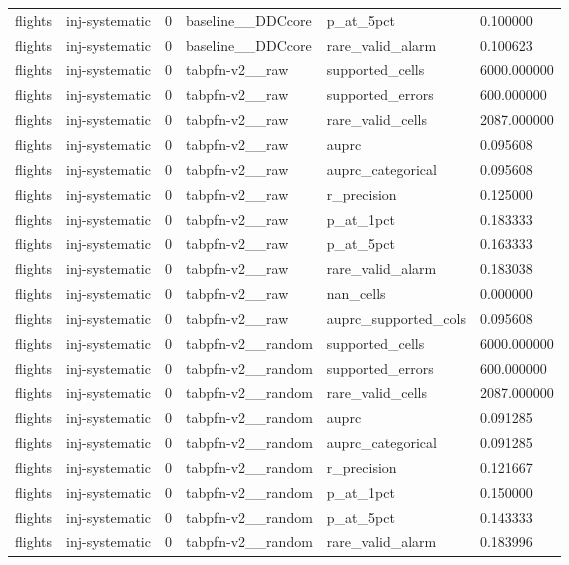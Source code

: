 \begin{tabular}{llllll}
flights & inj-systematic & 0 & baseline\_\_DDCcore & p\_at\_5pct & 0.100000 \\
flights & inj-systematic & 0 & baseline\_\_DDCcore & rare\_valid\_alarm & 0.100623 \\
flights & inj-systematic & 0 & tabpfn-v2\_\_raw & supported\_cells & 6000.000000 \\
flights & inj-systematic & 0 & tabpfn-v2\_\_raw & supported\_errors & 600.000000 \\
flights & inj-systematic & 0 & tabpfn-v2\_\_raw & rare\_valid\_cells & 2087.000000 \\
flights & inj-systematic & 0 & tabpfn-v2\_\_raw & auprc & 0.095608 \\
flights & inj-systematic & 0 & tabpfn-v2\_\_raw & auprc\_categorical & 0.095608 \\
flights & inj-systematic & 0 & tabpfn-v2\_\_raw & r\_precision & 0.125000 \\
flights & inj-systematic & 0 & tabpfn-v2\_\_raw & p\_at\_1pct & 0.183333 \\
flights & inj-systematic & 0 & tabpfn-v2\_\_raw & p\_at\_5pct & 0.163333 \\
flights & inj-systematic & 0 & tabpfn-v2\_\_raw & rare\_valid\_alarm & 0.183038 \\
flights & inj-systematic & 0 & tabpfn-v2\_\_raw & nan\_cells & 0.000000 \\
flights & inj-systematic & 0 & tabpfn-v2\_\_raw & auprc\_supported\_cols & 0.095608 \\
flights & inj-systematic & 0 & tabpfn-v2\_\_random & supported\_cells & 6000.000000 \\
flights & inj-systematic & 0 & tabpfn-v2\_\_random & supported\_errors & 600.000000 \\
flights & inj-systematic & 0 & tabpfn-v2\_\_random & rare\_valid\_cells & 2087.000000 \\
flights & inj-systematic & 0 & tabpfn-v2\_\_random & auprc & 0.091285 \\
flights & inj-systematic & 0 & tabpfn-v2\_\_random & auprc\_categorical & 0.091285 \\
flights & inj-systematic & 0 & tabpfn-v2\_\_random & r\_precision & 0.121667 \\
flights & inj-systematic & 0 & tabpfn-v2\_\_random & p\_at\_1pct & 0.150000 \\
flights & inj-systematic & 0 & tabpfn-v2\_\_random & p\_at\_5pct & 0.143333 \\
flights & inj-systematic & 0 & tabpfn-v2\_\_random & rare\_valid\_alarm & 0.183996 \\

\end{tabular}
